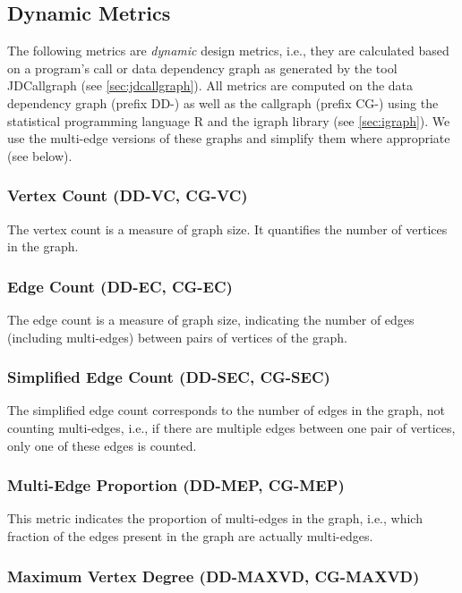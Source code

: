 \documentclass{scrartcl}
\begin{document}
\subsection{Dynamic Metrics}

The following metrics are \emph{dynamic} design metrics, i.e., they are
calculated based on a program's call or data dependency graph as generated by
the tool JDCallgraph (see \ref{sec:jdcallgraph}). All metrics are computed on
the data dependency graph (prefix DD-) as well as the callgraph (prefix CG-)
using the statistical programming language R and the igraph library (see
\ref{sec:igraph}). We use the multi-edge versions of these graphs and simplify
them where appropriate (see below).

\subsubsection{Vertex Count (DD-VC, CG-VC)}

The vertex count is a measure of graph size. It quantifies the number of
vertices in the graph.

\subsubsection{Edge Count (DD-EC, CG-EC)}

The edge count is a measure of graph size, indicating the number of edges
(including multi-edges) between pairs of vertices of the graph.

\subsubsection{Simplified Edge Count (DD-SEC, CG-SEC)}

The simplified edge count corresponds to the number of edges in the graph, not
counting multi-edges, i.e., if there are multiple edges between one pair of
vertices, only one of these edges is counted.

\subsubsection{Multi-Edge Proportion (DD-MEP, CG-MEP)}

This metric indicates the proportion of multi-edges in the graph, i.e., which
fraction of the edges present in the graph are actually multi-edges.

\subsubsection{Maximum Vertex Degree (DD-MAXVD, CG-MAXVD)}
\end{document}
